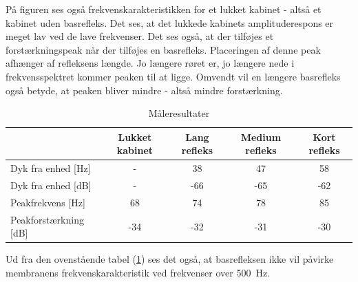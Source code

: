 På figuren ses også frekvenskarakteristikken for et lukket kabinet - altså et kabinet uden basrefleks. Det ses, at det lukkede kabinets amplituderespons er meget lav ved de lave frekvenser. Det ses også, at der tilføjes et forstærkningspeak når der tilføjes en basrefleks. Placeringen af denne peak afhænger af refleksens længde. Jo længere røret er, jo længere nede i frekvensspektret kommer peaken til at ligge. Omvendt vil en længere basrefleks også betyde, at peaken bliver mindre - altså mindre forstærkning.
\begin{table}[H]
	\centering
	\begin{tabular}{l|c|c|c|c}
		& Lukket kabinet & Lang refleks & Medium refleks & Kort refleks \\ \hline
		Dyk fra enhed {[}Hz{]}    & -              & 38              & 47                & 58             \\
		Dyk fra enhed {[}dB{]}    & -              & -66             & -65               & -62            \\
		Peakfrekvens {[}Hz{]}     & 68             & 74              & 78                & 85             \\
		Peakforstærkning {[}dB{]} & -34            & -32             & -31               & -30           
	\end{tabular}
	\caption{Måleresultater}
	\label{tab:meas_portlengths}
\end{table}

Ud fra den ovenstående tabel (\ref{tab:meas_portlengths}) ses det også, at basrefleksen ikke vil påvirke membranens frekvenskarakteristik ved frekvenser over \SI{500}{\hertz}.